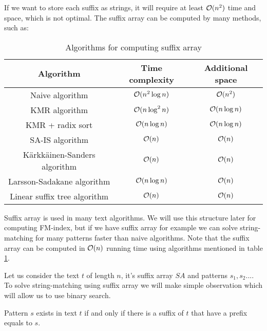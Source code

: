 If we want to store each suffix as strings, it will require at least $\mathcal{O}(n^2)$ time and space, which is not optimal. The suffix array can be computed by many methods, such as:
\begin{table}[H]
\caption{Algorithms for computing suffix array}
\begin{center}
\label{table:suffixArrayAlgos}
\begin{tabular}{|c|c|c|}
\hline
\rowcolor[HTML]{C0C0C0} 
Algorithm                    & Time complexity     & Additional space  \\ \hline
Naive algorithm              & $\mathcal{O}(n^2 \log n)$ & $\mathcal{O}(n^2)$      \\ \hline
KMR algorithm \cite{KMR}         & $\mathcal{O}(n \log^2 n)$  & $\mathcal{O}(n \log n)$ \\ \hline
KMR \cite{KMR} + radix sort \cite{radixSort}            & $\mathcal{O}(n \log n)$    & $\mathcal{O}(n \log n)$ \\ \hline
SA-IS algorithm \cite{SA-IS}             & $\mathcal{O}(n)$          & $\mathcal{O}(n)$        \\ \hline
Kärkkäinen-Sanders algorithm \cite{KS} & $\mathcal{O}(n)$          & $\mathcal{O}(n)$        \\ \hline
Larsson-Sadakane algorithm \cite{LS}   & $\mathcal{O}(n \log n)$          & $\mathcal{O}(n)$        \\ \hline
Linear suffix tree algorithm \cite{suffixTree}           & $\mathcal{O}(n)$          & $\mathcal{O}(n)$        \\ \hline
\end{tabular}
\end{center}
\end{table}

Suffix array is used in many text algorithms. We will use this structure later for computing FM-index, but if we have suffix array for example we can solve string-matching for many patterns faster than naive algorithms. Note that the suffix array can be computed in $\mathcal{O}(n)$ running time using algorithms mentioned in table \ref{table:suffixArrayAlgos}.
\newline
\newline

Let us consider the text $t$ of length $n$, it's suffix array $SA$ and patterns $s_1,s_2...$. To solve string-matching using suffix array we will make simple observation which will allow us to use binary search.

\begin{observation}
\label{observation:suffixArrayObservation}
Pattern $s$ exists in text $t$ if and only if there is a suffix of $t$ that have a prefix equals to $s$.
\end{observation}

